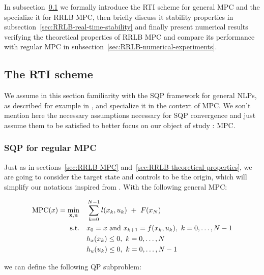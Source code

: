 \documentclass[12pt]{article}
\begin{document}
In subsection~\ref{sec:RTI-scheme} we formally introduce the RTI scheme for general MPC and the specialize it for RRLB MPC, then briefly discuss it stability properties in subsection~\ref{sec:RRLB-real-time-stability} and finally present numerical results verifying the theoretical properties of RRLB MPC and compare its performance with regular MPC in subsection~\ref{sec:RRLB-numerical-experiments}.

\subsection{The RTI scheme}\label{sec:RTI-scheme}

We assume in this section familiarity with the SQP framework for general NLPs, as described for example in \cite{nocedal-wright}, and specialize it in the context of MPC.
We son't mention here the necessary assumptions necessary for SQP convergence and just assume them to be satisfied to better focus on our object of study : MPC.

\subsubsection{SQP for regular MPC}

Just as in sections~\ref{sec:RRLB-MPC} and~\ref{sec:RRLB-theoretical-properties}, we are going to consider the target state and controls to be the origin, which will simplify our notations inspired from \cite{mpc-rti}.
With the following general MPC:

\begin{align*}
	\mathrm{MPC}(x)=\underset{\bf{x},\bf{u}}{\min} &\quad \sum_{k=0}^{N-1}l(x_k,u_k)~+~F(x_N)\\
	\text{s.t.} &\quad x_0=x\text{ and }x_{k+1}=f(x_k,u_k),~k=0,\ldots,N-1\\
	&\quad h_x(x_k)\leq 0,~k=0,\ldots,N\\
	&\quad h_u(u_k)\leq 0,~k=0,\ldots,N-1
\end{align*}

\noindent we can define the following QP subproblem:
\end{document}
